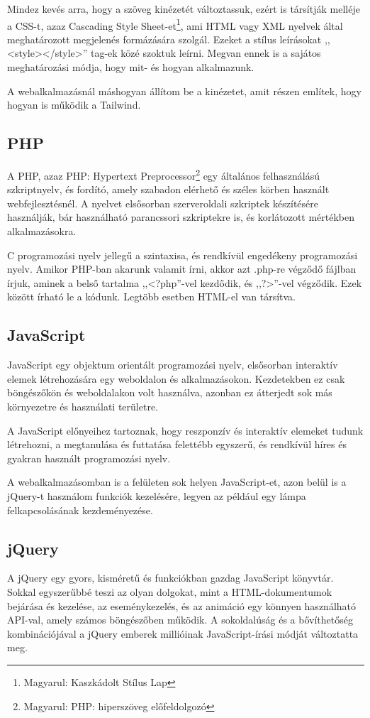 \documentclass[
]{thesis-ekf}
\theoremstyle{definition}
\theoremstyle{remark}
\begin{document}
	Mindez kevés arra, hogy a szöveg kinézetét változtassuk, ezért is társítják melléje a CSS-t, azaz Cascading Style Sheet-et\footnote{Magyarul: Kaszkádolt Stílus Lap}, ami HTML vagy XML nyelvek által meghatározott megjelenés formázására szolgál. Ezeket a stílus leírásokat ,,<style></style>'' tag-ek közé szoktuk leírni. Megvan ennek is a sajátos meghatározási módja, hogy mit- és hogyan alkalmazunk.
	
	A webalkalmazásnál máshogyan állítom be a kinézetet, amit  részen említek, hogy hogyan is működik a Tailwind.
	
	\subsection{PHP}
	A PHP, azaz PHP: Hypertext Preprocessor\footnote{Magyarul: PHP: hiperszöveg előfeldolgozó} egy általános felhasználású szkriptnyelv, és fordító, amely szabadon elérhető és széles körben használt webfejlesztésnél. A nyelvet elsősorban szerveroldali szkriptek készítésére használják, bár használható parancssori szkriptekre is, és korlátozott mértékben alkalmazásokra.\cite{php}
	
	C programozási nyelv jellegű a szintaxisa, és rendkívül engedékeny programozási nyelv. Amikor PHP-ban akarunk valamit írni, akkor azt .php-re végződő fájlban írjuk, aminek a belső tartalma ,,<?php''-vel kezdődik, és ,,?>''-vel végződik. Ezek között írható le a kódunk. Legtöbb esetben HTML-el van társítva.
	
	\subsection{JavaScript}
	JavaScript egy objektum orientált programozási nyelv, elsősorban interaktív elemek létrehozására egy weboldalon és alkalmazásokon. Kezdetekben ez csak böngészőkön és weboldalakon volt használva, azonban ez átterjedt sok más környezetre és használati területre.
	
	A JavaScript előnyeihez tartoznak, hogy reszponzív és interaktív elemeket tudunk létrehozni, a megtanulása és futtatása felettébb egyszerű, és rendkívül híres és gyakran használt programozási nyelv.\cite{javascript}
	
	A webalkalmazásomban is a felületen sok helyen JavaScript-et, azon belül is a jQuery-t használom funkciók kezelésére, legyen az például egy lámpa felkapcsolásának kezdeményezése.
	
	\subsection{jQuery}
	A jQuery egy gyors, kisméretű és funkciókban gazdag JavaScript könyvtár. Sokkal egyszerűbbé teszi az olyan dolgokat, mint a HTML-dokumentumok bejárása és kezelése, az eseménykezelés, és az animáció egy könnyen használható API-val, amely számos böngészőben működik. A sokoldalúság és a bővíthetőség kombinációjával a jQuery emberek millióinak JavaScript-írási módját változtatta meg. \cite{jquery}
	
\end{document}
